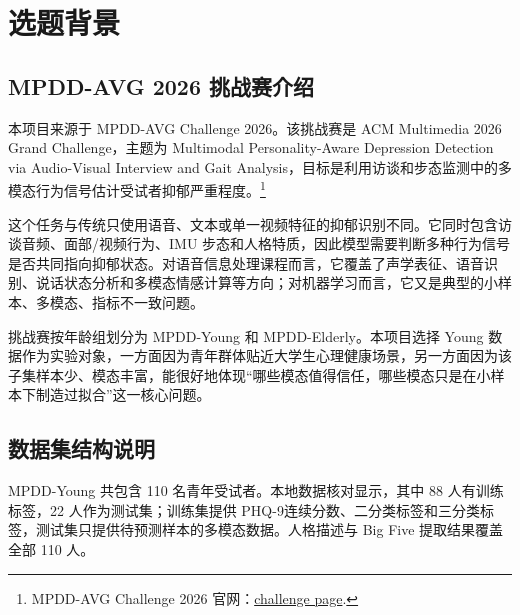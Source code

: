 \documentclass[UTF8,zihao=-4,fontset=windows]{ctexart}
\newcommand{\phq}{PHQ-9}
\begin{document}
\tableofcontents
\clearpage
{}

\section{选题背景}

\subsection{MPDD-AVG 2026 挑战赛介绍}

本项目来源于 MPDD-AVG Challenge 2026。该挑战赛是 ACM Multimedia 2026 Grand Challenge，主题为 Multimodal Personality-Aware Depression Detection via Audio-Visual Interview and Gait Analysis，目标是利用访谈和步态监测中的多模态行为信号估计受试者抑郁严重程度。\footnote{MPDD-AVG Challenge 2026 官网：\href{https://hacilab.github.io/MPDD-AVG-2026.github.io/challenge.html}{challenge page}.}

这个任务与传统只使用语音、文本或单一视频特征的抑郁识别不同。它同时包含访谈音频、面部/视频行为、IMU 步态和人格特质，因此模型需要判断多种行为信号是否共同指向抑郁状态。对语音信息处理课程而言，它覆盖了声学表征、语音识别、说话状态分析和多模态情感计算等方向；对机器学习而言，它又是典型的小样本、多模态、指标不一致问题。

挑战赛按年龄组划分为 MPDD-Young 和 MPDD-Elderly。本项目选择 Young 数据作为实验对象，一方面因为青年群体贴近大学生心理健康场景，另一方面因为该子集样本少、模态丰富，能很好地体现“哪些模态值得信任，哪些模态只是在小样本下制造过拟合”这一核心问题。

\subsection{数据集结构说明}

MPDD-Young 共包含 110 名青年受试者。本地数据核对显示，其中 88 人有训练标签，22 人作为测试集；训练集提供 \phq 连续分数、二分类标签和三分类标签，测试集只提供待预测样本的多模态数据。人格描述与 Big Five 提取结果覆盖全部 110 人。
\end{document}
